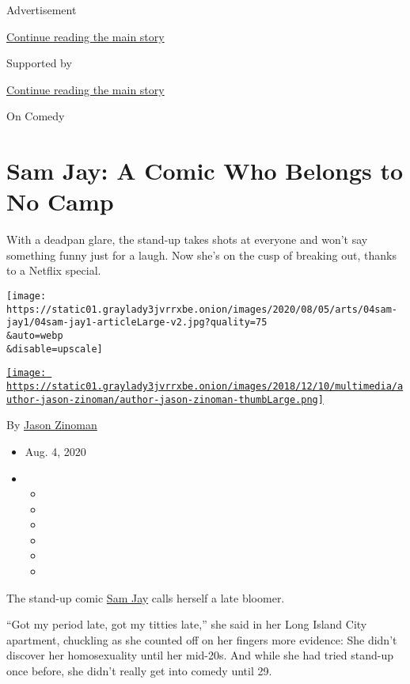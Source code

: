 Advertisement

\protect\hyperlink{after-top}{Continue reading the main story}

Supported by

\protect\hyperlink{after-sponsor}{Continue reading the main story}

On Comedy

\hypertarget{sam-jay-a-comic-who-belongs-to-no-camp}{%
\section{Sam Jay: A Comic Who Belongs to No
Camp}\label{sam-jay-a-comic-who-belongs-to-no-camp}}

With a deadpan glare, the stand-up takes shots at everyone and won't say
something funny just for a laugh. Now she's on the cusp of breaking out,
thanks to a Netflix special.

\texttt{[image: https://static01.graylady3jvrrxbe.onion/images/2020/08/05/arts/04sam-jay1/04sam-jay1-articleLarge-v2.jpg?quality=75\\\&auto=webp\\\&disable=upscale]}

\href{https://www.nytimes3xbfgragh.onion/by/jason-zinoman}{\texttt{[image: https://static01.graylady3jvrrxbe.onion/images/2018/12/10/multimedia/author-jason-zinoman/author-jason-zinoman-thumbLarge.png]}}

By \href{https://www.nytimes3xbfgragh.onion/by/jason-zinoman}{Jason
Zinoman}

\begin{itemize}
\item
  Aug. 4, 2020
\item
  \begin{itemize}
  \item
  \item
  \item
  \item
  \item
  \item
  \end{itemize}
\end{itemize}

The stand-up comic \href{https://samjaycomic.com/}{Sam Jay} calls
herself a late bloomer.

``Got my period late, got my titties late,'' she said in her Long Island
City apartment, chuckling as she counted off on her fingers more
evidence: She didn't discover her homosexuality until her mid-20s. And
while she had tried stand-up once before, she didn't really get into
comedy until 29.

